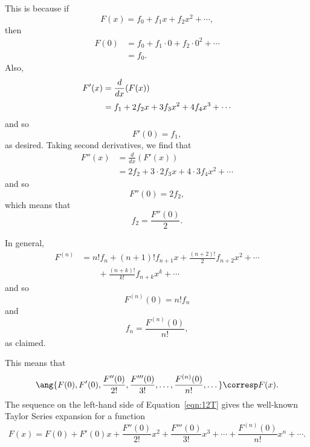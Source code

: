 This is because if
\begin{equation*}
    F(x) = f_0 + f_1 x + f_2 x^2 + \cdots,
\end{equation*}
then
\begin{align*}
    F(0) &= f_0 + f_1 \cdot 0 + f_2 \cdot 0^2 + \cdots \\
         &= f_0.
\end{align*}
Also,
\begin{align*}
F'(x)   &= \frac{d}{dx} (F(x)) \\[\jot]
        &= f_1 + 2 f_2 x + 3 f_3 x^2 + 4 f_4 x^3 + \cdots
\end{align*}
and so
\begin{equation*}
    F'(0) = f_1,
\end{equation*}
as desired.  Taking second derivatives, we find that
\begin{align*}
F''(x)  &= \frac{d}{dx} (F'(x)) \\
        &= 2 f_2 + 3 \cdot 2 f_3 x + 4 \cdot 3 f_4 x^2 + \cdots
\end{align*}
and so
\begin{equation*}
    F''(0) = 2 f_2,
\end{equation*}
which means that
\begin{equation*}
    f_2 = \frac{F''(0)}{2}.
\end{equation*}

In general,
\begin{align*}
F^{(n)}
    &= n! f_n
        + (n + 1)! f_{n + 1} x
        + \frac{(n + 2)!}{2} f_{n + 2} x^2
        + \cdots \\
    & \qquad {} + \frac{(n + k)!}{k!} f_{n + k} x^k
        + \cdots
\end{align*}
and so
\begin{equation*}
    F^{(n)}(0) = n! f_n
\end{equation*}
and
\begin{equation*}
    f_n = \frac{F^{(n)}(0)}{n!},
\end{equation*}
as claimed.

This means that
\begin{equation}\label{eqn:12T}
\ang{ F(0), F'(0), \frac{F''(0)}{2!}, \frac{F'''(0)}{3!}, \dots, 
    \frac{F^{(n)}(0)}{n!}, \dots }
\corresp F(x).
\end{equation}
The sequence on the left-hand side of Equation~\ref{eqn:12T} gives the
well-known Taylor Series expansion for a function
\begin{equation*}
F(x) = F(0) + F'(0) x + \frac{F''(0)}{2!} x^2 +
    \frac{F'''(0)}{3!} x^3 + \cdots + 
    \frac{F^{(n)}(0)}{n!} x^n + \cdots.
\end{equation*}

